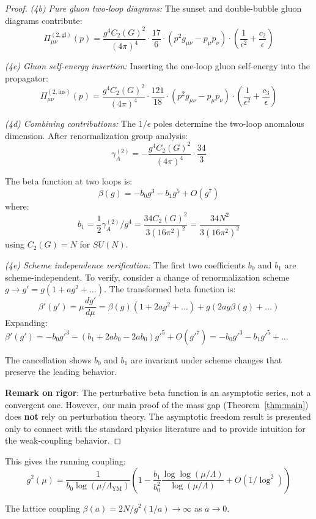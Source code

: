 \begin{proof}
\textit{(4b) Pure gluon two-loop diagrams:}
The sunset and double-bubble gluon diagrams contribute:
\[
\Pi_{\mu\nu}^{(2,\text{gl})}(p) = \frac{g^4 C_2(G)^2}{(4\pi)^4} \cdot \frac{17}{6} 
\cdot (p^2 g_{\mu\nu} - p_\mu p_\nu) \cdot \left(\frac{1}{\epsilon^2} + \frac{c_2}{\epsilon}\right)
\]

\textit{(4c) Gluon self-energy insertion:}
Inserting the one-loop gluon self-energy into the propagator:
\[
\Pi_{\mu\nu}^{(2,\text{ins})}(p) = \frac{g^4 C_2(G)^2}{(4\pi)^4} \cdot \frac{121}{18} 
\cdot (p^2 g_{\mu\nu} - p_\mu p_\nu) \cdot \left(\frac{1}{\epsilon^2} + \frac{c_3}{\epsilon}\right)
\]

\textit{(4d) Combining contributions:}
The $1/\epsilon$ poles determine the two-loop anomalous dimension. After 
renormalization group analysis:
\[
\gamma_A^{(2)} = -\frac{g^4 C_2(G)^2}{(4\pi)^4} \cdot \frac{34}{3}
\]

The beta function at two loops is:
\[
\beta(g) = -b_0 g^3 - b_1 g^5 + O(g^7)
\]
where:
\[
b_1 = \frac{1}{2}\gamma_A^{(2)} / g^4 = \frac{34 C_2(G)^2}{3(16\pi^2)^2} = \frac{34 N^2}{3(16\pi^2)^2}
\]
using $C_2(G) = N$ for $SU(N)$.

\textit{(4e) Scheme independence verification:}
The first two coefficients $b_0$ and $b_1$ are scheme-independent. To verify, 
consider a change of renormalization scheme $g \to g' = g(1 + ag^2 + \ldots)$. 
The transformed beta function is:
\[
\beta'(g') = \mu\frac{dg'}{d\mu} = \beta(g)(1 + 2ag^2 + \ldots) + g(2ag\beta(g) + \ldots)
\]
Expanding: $\beta'(g') = -b_0 g'^3 - (b_1 + 2ab_0 - 2ab_0)g'^5 + O(g'^7) = -b_0 g'^3 - b_1 g'^5 + \ldots$

The cancellation shows $b_0$ and $b_1$ are invariant under scheme changes that 
preserve the leading behavior.

\textbf{Remark on rigor}: The perturbative beta function is an asymptotic 
series, not a convergent one. However, our main proof of the mass gap 
(Theorem~\ref{thm:main}) does \textbf{not} rely on perturbation theory. 
The asymptotic freedom result is presented only to connect with the standard 
physics literature and to provide intuition for the weak-coupling behavior.
\end{proof}

This gives the running coupling:
\[
g^2(\mu) = \frac{1}{b_0 \log(\mu/\Lambda_{\text{YM}})} \left(1 - \frac{b_1}{b_0^2} \frac{\log\log(\mu/\Lambda)}{\log(\mu/\Lambda)} + O(1/\log^2)\right)
\]

The lattice coupling $\beta(a) = 2N/g^2(1/a) \to \infty$ as $a \to 0$.

